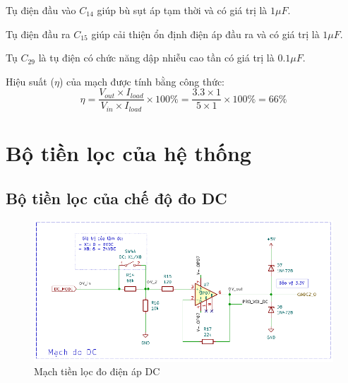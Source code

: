 Tụ điện đầu vào $C_{14}$ giúp bù sụt áp tạm thời và có giá trị là $1\mu F$.

Tụ điện đầu ra $C_{15}$ giúp cải thiện ổn định điện áp đầu ra và có giá trị là $1\mu F$.

Tụ $C_{29}$ là tụ điện có chức năng dập nhiễu cao tần có giá trị là $0.1\mu F$.

Hiệu suất ($\eta$) của mạch được tính bằng công thức: \[ \eta = \dfrac{V_{out}\times I_{load}}{V_{in} \times I_{load}}\times 100\% = \dfrac{3.3\times 1}{5 \times 1}\times 100\% = 66\% \]

\section{Bộ tiền lọc của hệ thống}
\subsection{Bộ tiền lọc của chế độ đo DC}

\begin{figure}[H]
	\centering
	\includegraphics[width=0.6\linewidth]{./picture/board_DC.pdf}
	\caption{Mạch tiền lọc đo điện áp DC}
	\label{f_board_Dc}
\end{figure}

